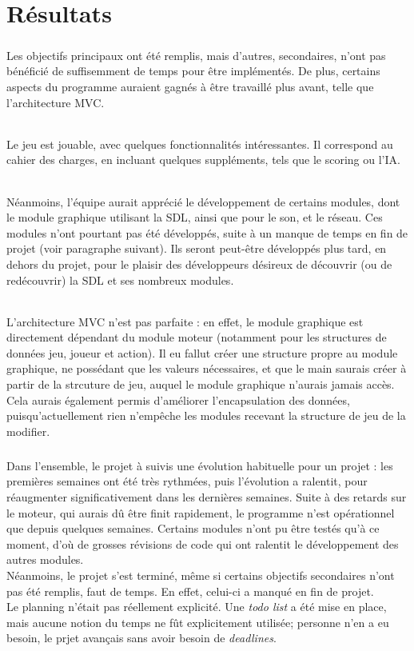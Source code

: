 \documentclass{report}
\begin{document}
\chapter{Résultats} %
    \paragraph*{} %
    Les objectifs principaux ont été remplis, mais d'autres, secondaires, n'ont pas bénéficié de suffisemment de temps pour être implémentés. De plus, certains aspects du programme 
        auraient gagnés à être travaillé plus avant, telle que l'architecture MVC.
        \subparagraph*{} %
        Le jeu est jouable, avec quelques fonctionnalités intéressantes. Il correspond au cahier des charges, en incluant quelques suppléments, tels que le scoring ou l'IA.
        \subparagraph*{} %
        Néanmoins, l'équipe aurait apprécié le développement de certains modules, dont le module graphique utilisant la SDL, ainsi que pour le son, et le réseau. Ces modules n'ont 
            pourtant pas été développés, suite à un manque de temps en fin de projet (voir paragraphe suivant). Ils seront peut-être développés plus tard, en dehors du projet, 
            pour le plaisir des développeurs désireux de découvrir (ou de redécouvrir) la SDL et ses nombreux modules.
        \subparagraph*{} %
        L'architecture MVC n'est pas parfaite : en effet, le module graphique est directement dépendant du module moteur (notamment pour les structures de données jeu, joueur et action).
        Il eu fallut créer une structure propre au module graphique, ne possédant que les valeurs nécessaires, et que le main saurais créer à partir de la strcuture de jeu, auquel le
        module graphique n'aurais jamais accès. \\
        Cela aurais également permis d'améliorer l'encapsulation des données, puisqu'actuellement rien n'empêche les modules recevant la structure de jeu de la modifier.
    \paragraph*{} %
    Dans l'ensemble, le projet à suivis une évolution habituelle pour un projet : les premières semaines ont été très rythmées, puis l'évolution a ralentit, 
        pour réaugmenter significativement dans les dernières semaines. Suite à des retards sur le moteur, qui aurais dû être finit rapidement, le programme n'est opérationnel que depuis
        quelques semaines. Certains modules n'ont pu être testés qu'à ce moment, d'où de grosses révisions de code qui ont ralentit le développement des autres modules. \\
        Néanmoins, le projet s'est terminé, même si certains objectifs secondaires n'ont pas été remplis, faut de temps. En effet, celui-ci a manqué en fin de projet. \\
        Le planning n'était pas réellement explicité. Une \textit{todo list} a été mise en place, mais aucune notion du temps ne fût explicitement utilisée; personne n'en a eu besoin, 
        le prjet avançais sans avoir besoin de \textit{deadlines}. 
\end{document}
